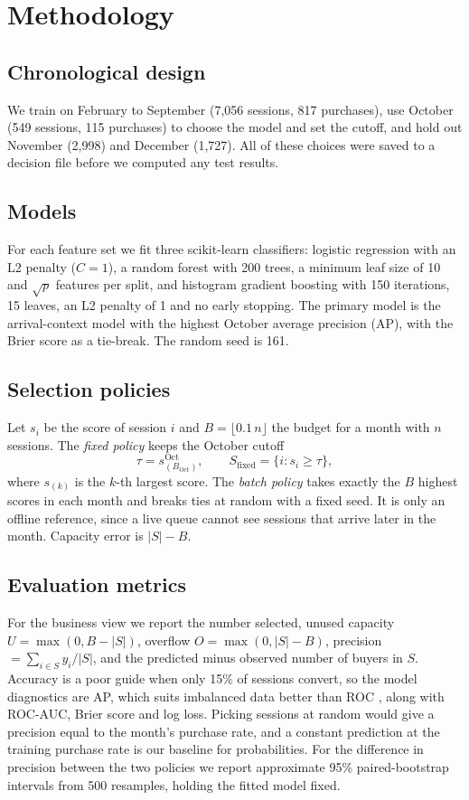\documentclass[conference]{IEEEtran}
\begin{document}
\section{Methodology}
\subsection{Chronological design}
We train on February to September (7,056 sessions, 817 purchases), use October (549 sessions, 115
purchases) to choose the model and set the cutoff, and hold out November (2,998) and December (1,727).
All of these choices were saved to a decision file before we computed any test results.

\subsection{Models}
For each feature set we fit three scikit-learn \cite{b5} classifiers: logistic regression with an L2
penalty ($C=1$), a random forest \cite{b15} with 200 trees, a minimum leaf size of 10 and $\sqrt{p}$
features per split, and histogram gradient boosting \cite{b16} with 150 iterations, 15 leaves, an L2
penalty of 1 and no early stopping. The primary model is the arrival-context model with the highest
October average precision (AP), with the Brier score as a tie-break. The random seed is 161.

\subsection{Selection policies}
Let $s_i$ be the score of session $i$ and $B=\lfloor 0.1\,n\rfloor$ the budget for a month with $n$
sessions. The \emph{fixed policy} keeps the October cutoff
\begin{equation}
\tau = s^{\mathrm{Oct}}_{(B_{\mathrm{Oct}})},\qquad S_{\mathrm{fixed}}=\{i : s_i \ge \tau\},
\end{equation}
where $s_{(k)}$ is the $k$-th largest score. The \emph{batch policy} takes exactly the $B$ highest scores
in each month and breaks ties at random with a fixed seed. It is only an offline reference, since a live
queue cannot see sessions that arrive later in the month. Capacity error is $|S|-B$.

\subsection{Evaluation metrics}
For the business view we report the number selected, unused capacity $U=\max(0,B-|S|)$, overflow
$O=\max(0,|S|-B)$, precision $=\sum_{i\in S}y_i/|S|$, and the predicted minus observed number of buyers
in $S$. Accuracy is a poor guide when only 15\% of sessions convert, so the model diagnostics are AP,
which suits imbalanced data better than ROC \cite{b17}, along with ROC-AUC, Brier score and log loss.
Picking sessions at random would give a precision equal to the month's purchase rate, and a constant
prediction at the training purchase rate is our baseline for probabilities. For the difference in
precision between the two policies we report approximate 95\% paired-bootstrap intervals \cite{b18}
from 500 resamples, holding the fitted model fixed.
\end{document}
